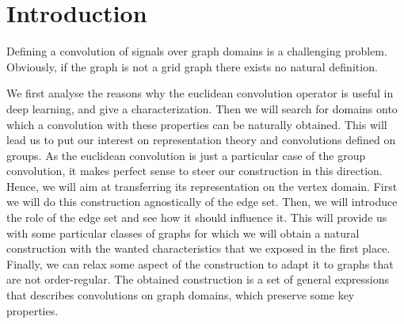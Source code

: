 \section*{Introduction}

Defining a convolution of signals over graph domains is a challenging problem. Obviously, if the graph is not a grid graph there exists no natural definition.

We first analyse the reasons why the euclidean convolution operator is useful in deep learning, and give a characterization. Then we will search for domains onto which a convolution with these properties can be naturally obtained. This will lead us to put our interest on representation theory and convolutions defined on groups. As the euclidean convolution is just a particular case of the group convolution, it makes perfect sense to steer our construction in this direction. Hence, we will aim at transferring its representation on the vertex domain. First we will do this construction agnostically of the edge set. Then, we will introduce the role of the edge set and see how it should influence it. This will provide us with some particular classes of graphs for which we will obtain a natural construction with the wanted characteristics that we exposed in the first place. Finally, we can relax some aspect of the construction to adapt it to graphs that are not order-regular. The obtained construction is a set of general expressions that describes convolutions on graph domains, which preserve some key properties.